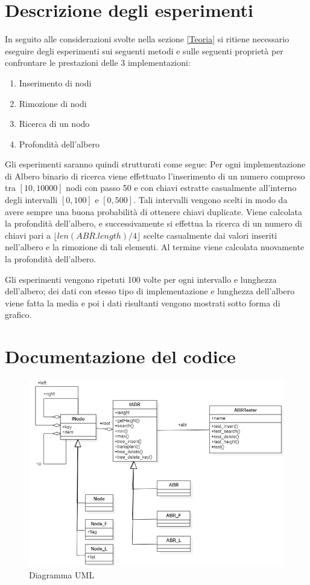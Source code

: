 \documentclass{article}
\begin{document}
\section{Descrizione degli esperimenti} \label{esperimenti}
In seguito alle considerazioni svolte nella sezione \ref{Teoria} si ritiene necessario eseguire degli esperimenti sui seguenti metodi e sulle seguenti proprietà per confrontare le prestazioni delle 3 implementazioni:
\begin{enumerate}
    \item Inserimento di nodi
    \item Rimozione di nodi
    \item Ricerca di un nodo
    \item Profondità dell'albero
\end{enumerate}
Gli esperimenti saranno quindi strutturati come segue:
Per ogni implementazione di Albero binario di ricerca viene effettuato l'inserimento di un numero compreso tra \( [10, 10000] \) nodi con passo 50 e con chiavi estratte casualmente all'interno degli intervalli \( [0, 100]\) e \( [0, 500]\). Tali intervalli vengono scelti in modo da avere sempre una buona probabilità di ottenere chiavi duplicate. Viene calcolata la profondità dell'albero, e successivamente si effettua la ricerca di un numero di chiavi pari a \( \lfloor len(ABR.length) / 4 \rfloor \) scelte casualmente dai valori inseriti nell'albero e la rimozione di tali elementi. Al termine viene calcolata nuovamente la profondità dell'albero. 

Gli esperimenti vengono ripetuti 100 volte per ogni intervallo e lunghezza dell'albero; dei dati con stesso tipo di implementazione e lunghezza dell'albero viene fatta la media e poi i dati risultanti vengono mostrati sotto forma di grafico. 
\section{Documentazione del codice}

\begin{figure}[h!] \label{uml}
\centering
\includegraphics[width=\textwidth]{uml}
\caption{Diagramma UML}
\end{figure}
\end{document}
